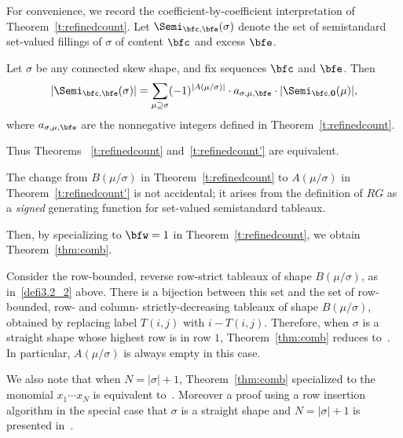 
For convenience, we record the coefficient-by-coefficient interpretation of Theorem~\ref{t:refinedcount}. Let $\Semi_{\bfc,\bfe}(\sigma)$ denote the set of semistandard set-valued fillings of $\sigma$ of content $\bfc$ and excess $\bfe$.

\begin{theorem} \label{t:refinedcount'} Let $\sigma$ be any connected skew shape, and fix sequences $\bfc$ and $\bfe$. Then 
\[
|\Semi_{\bfc,\bfe}(\sigma)| = \sum_{\mu \supseteq \sigma} (-1)^{|A(\mu/\sigma)|} \cdot a_{\sigma,\mu,\bfe} \cdot |\Semi_{\bfc, \mathbf{0}} (\mu)|,
\]
where $a_{\sigma,\mu,\bfe}$ are the nonnegative integers defined in Theorem~\ref{t:refinedcount}.
\end{theorem}

Thus Theorems ~\ref{t:refinedcount} and~\ref{t:refinedcount'} are equivalent.

\begin{rema}
The change from $B(\mu/\sigma)$ in Theorem~\ref{t:refinedcount} to $A(\mu/\sigma)$ in Theorem~\ref{t:refinedcount'} is not accidental; it arises from the definition of $RG$ as a \emph{signed} generating function for set-valued semistandard tableaux.
\end{rema}

Then, by specializing to $\bfw = 1$ in Theorem~\ref{t:refinedcount}, we obtain Theorem~\ref{thm:comb}.



\begin{rema} \label{rem:connection-to-lenart}
Consider the row-bounded, reverse row-strict tableaux of shape $B(\mu/\sigma)$, as in~\eqref{defi3.2_2} above. There is a bijection between this set and the set of row-bounded, row- and column- strictly-decreasing tableaux of shape $B(\mu/\sigma)$, obtained by replacing label $T(i,j)$ with $i-T(i,j)$. Therefore, when $\sigma$ is a straight shape whose highest row is in row $1$, Theorem~\ref{thm:comb} reduces to~\cite[Theorem~2.2]{lenart-combinatorial}. In particular, $A(\mu/\sigma)$ is always empty in this case. 

We also note that when $N=|\sigma|+1$, Theorem~\ref{thm:comb} specialized to the monomial $x_1\cdots x_N$ is equivalent to~\cite[Theorem~2.8]{clpt}.
Moreover a proof using a row insertion algorithm in the special case that $\sigma$ is a straight shape and $N=|\sigma|+1$ is presented in~\cite[Proposition~3.9]{reiner-tenner-yong}.
\end{rema}




